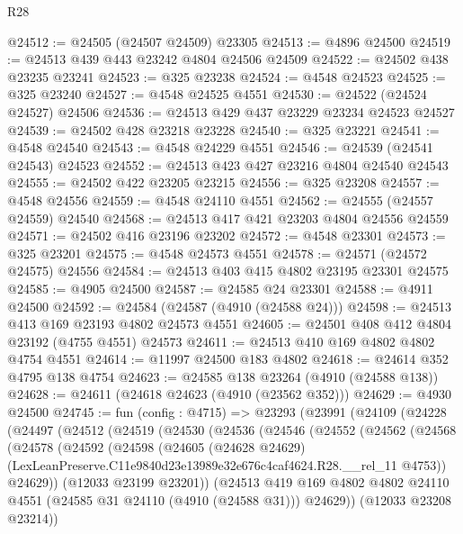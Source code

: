 \begin{lexlean}{R28}
\begin{coremodule}
@24512 := @24505 (@24507 @24509) @23305
@24513 := @4896 @24500
@24519 := @24513 @439 @443 @23242 @4804 @24506 @24509
@24522 := @24502 @438 @23235 @23241
@24523 := @325 @23238
@24524 := @4548 @24523
@24525 := @325 @23240
@24527 := @4548 @24525 @4551
@24530 := @24522 (@24524 @24527) @24506
@24536 := @24513 @429 @437 @23229 @23234 @24523 @24527
@24539 := @24502 @428 @23218 @23228
@24540 := @325 @23221
@24541 := @4548 @24540
@24543 := @4548 @24229 @4551
@24546 := @24539 (@24541 @24543) @24523
@24552 := @24513 @423 @427 @23216 @4804 @24540 @24543
@24555 := @24502 @422 @23205 @23215
@24556 := @325 @23208
@24557 := @4548 @24556
@24559 := @4548 @24110 @4551
@24562 := @24555 (@24557 @24559) @24540
@24568 := @24513 @417 @421 @23203 @4804 @24556 @24559
@24571 := @24502 @416 @23196 @23202
@24572 := @4548 @23301
@24573 := @325 @23201
@24575 := @4548 @24573 @4551
@24578 := @24571 (@24572 @24575) @24556
@24584 := @24513 @403 @415 @4802 @23195 @23301 @24575
@24585 := @4905 @24500
@24587 := @24585 @24 @23301
@24588 := @4911 @24500
@24592 := @24584 (@24587 (@4910 (@24588 @24)))
@24598 := @24513 @413 @169 @23193 @4802 @24573 @4551
@24605 := @24501 @408 @412 @4804 @23192 (@4755 @4551) @24573
@24611 := @24513 @410 @169 @4802 @4802 @4754 @4551
@24614 := @11997 @24500 @183 @4802
@24618 := @24614 @352 @4795 @138 @4754
@24623 := @24585 @138 @23264 (@4910 (@24588 @138))
@24628 := @24611 (@24618 @24623 (@4910 (@23562 @352)))
@24629 := @4930 @24500
@24745 := fun (config : @4715) =>
  @23293
    (@23991
      (@24109
        (@24228
          (@24497
            (@24512
              (@24519
                (@24530
                  (@24536
                    (@24546
                      (@24552
                        (@24562
                          (@24568
                            (@24578
                              (@24592
                                (@24598
                                  (@24605
                                    (@24628 @24629)
                                    (LexLeanPreserve.C11e9840d23e13989e32e676c4caf4624.R28.__rel_11
                                      @4753))
                                  @24629))
                              (@12033 @23199 @23201))
                            (@24513
                              @419
                              @169
                              @4802
                              @4802
                              @24110
                              @4551
                              (@24585 @31 @24110 (@4910 (@24588 @31)))
                              @24629))
                          (@12033 @23208 @23214))

\end{coremodule}
\end{lexlean}
